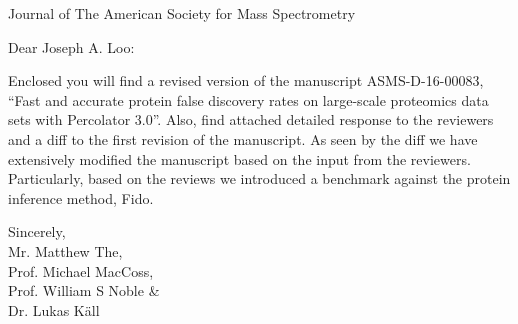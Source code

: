 \documentclass[a4paper]{letter}
\begin{document}
\begin{letter}{Journal of The American Society
  for Mass Spectrometry}
\vspace*{-5.0cm}

\opening{Dear Joseph A. Loo:}

Enclosed you will find a revised version of the manuscript
ASMS-D-16-00083, ``Fast and accurate protein false discovery rates on
large-scale proteomics data sets with Percolator 3.0''. Also, find
attached detailed response to the reviewers and a diff to the first
revision of the manuscript. As seen by the diff we have extensively
modified the manuscript based on the input from the
reviewers. Particularly, based on the reviews we introduced a
benchmark against the protein inference method, Fido.

Sincerely,\\[2em]
Mr. Matthew The,\\
Prof. Michael MacCoss,\\
Prof. William S Noble \& \\
Dr. Lukas K\"all

\end{letter}
\end{document}
